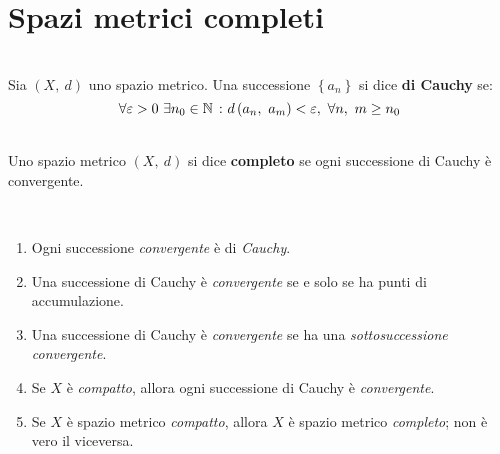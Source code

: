 \section{Spazi metrici completi}
\begin{define}~{}\\
	Sia $\left(X,\ d\right)$ uno spazio metrico. Una successione $\left\{a_n\right\}$ si dice \textbf{di Cauchy} se:
	\begin{equation}
		\forall \epsilon>0\ \exists n_0\in\naturalset\ \colon \mvf{d}{a_n}{a_m}<\epsilon,\ \forall n,\ m\geq n_0
	\end{equation}
\vspace{-6mm}
\end{define}
\begin{define}~{}\\
	Uno spazio metrico $\left(X,\ d\right)$ si dice \textbf{completo} {\small se ogni successione di Cauchy è convergente.}
\end{define}
\begin{observes}~{}
	\begin{enumerate}
		\item Ogni successione \textit{convergente} è di \textit{Cauchy}.
		\item Una successione di Cauchy è \textit{convergente} se e solo se ha punti di accumulazione.
		\item Una successione di Cauchy è \textit{convergente} se ha una \textit{sottosuccessione convergente}.
		\item Se $X$ è \textit{compatto}, allora ogni successione di Cauchy è \textit{convergente}.
		\item Se $X$ è spazio metrico \textit{compatto}, allora $X$ è spazio metrico \textit{completo}; non è vero il viceversa.
	\end{enumerate}
\vspace{-3mm}
\end{observes}
